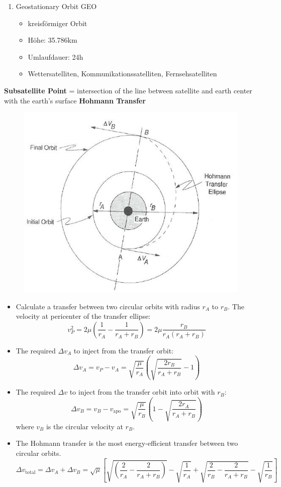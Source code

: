 \documentclass[a4paper,10pt]{article}
\newcommand{\f}{\textbf}
\begin{document}
\begin{enumerate}
 \item Geostationary Orbit GEO
 \begin{itemize}
  \item kreisförmiger Orbit
  \item Höhe: 35.786km
  \item Umlaufdauer: 24h
  \item Wettersatelliten, Kommunikationssatelliten, Fernsehsatelliten
 \end{itemize}

\end{enumerate}

\noindent \f{Subsatellite Point} = intersection of the line between satellite and earth center with the earth's surface 
\noindent \f{Hohmann Transfer}
\begin{figure}[!ht]
 \centering
 \includegraphics[scale=0.6]{hohmann}
\end{figure}

\begin{itemize}
\item Calculate a transfer between two circular orbits with radius $r_A$ to $r_B$. The velocity at pericenter of the transfer ellipse:
\[ v_P^2 = 2 \mu \left( \frac{1}{r_A} - \frac{1}{r_A + r_B} \right) = 2 \mu \frac{r_B}{r_A(r_A+r_B)} \]
\item The required $\Delta v_A$ to inject from the transfer orbit:
\[ \Delta v_A = v_P - v_A = \sqrt{\frac{\mu}{r_A}} \left( \sqrt{\frac{2r_B}{r_A+r_B}} -1\right) \]
\item The required $\Delta v$ to inject from the transfer orbit into orbit with $r_B$:
\[ \Delta v_B = v_B - v_\text{apo} = \sqrt{\frac{\mu}{r_B}} \left( 1 - \sqrt{\frac{2r_A}{r_A+r_B}}\right) \]
where $v_B$ is the circular velocity at $r_B$.
\item The Hohmann transfer is the most energy-efficient transfer between two circular orbits.
\[ \Delta v_\text{total} =  \Delta v_A + \Delta v_B = \sqrt{\mu}\left[ \sqrt{\left( \frac{2}{r_A} - \frac{2}{r_A+r_B} \right)} - \sqrt{\frac{1}{r_A}} + \sqrt{\frac{2}{r_B}-\frac{2}{r_A+r_B}} - \sqrt{\frac{1}{r_B}} \right]\]
\end{itemize}
\end{document}
